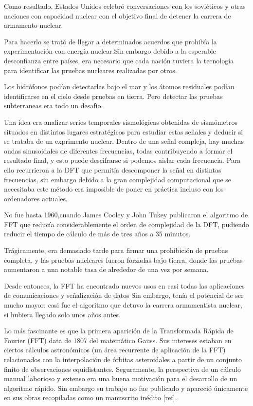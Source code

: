 \noindent Como resultado, Estados Unidos celebró conversaciones con los soviéticos y otras naciones con capacidad nuclear con el objetivo final de detener la carrera de armamento nuclear.

\noindent Para hacerlo se trató de llegar a determinados acuerdos que prohibía la experimentación con energía nuclear.Sin embargo debido a la esperable desconfianza entre países, era necesario que cada nación tuviera la tecnología para identificar las pruebas nucleares realizadas por otros. 

\noindent Los hidrófonos podían detectarlas bajo el mar y los átomos residuales podían identificarse en el cielo desde pruebas en tierra. Pero detectar las pruebas subterraneas era todo un desafío.


\noindent Una idea era analizar series temporales
sismológicas obtenidas de sismómetros situados en distintos lugares estratégicos para estudiar estas señales y deducir si se trataba de un exprimento nuclear.
Dentro de una señal compleja, hay muchas ondas sinusoidales de diferentes frecuencias, todas contribuyendo a formar el resultado final, y esto puede descifrarse si podemos aislar cada frecuencia. Para ello  recurrieron a la DFT que permitía descomponer la señal en distintas frecuencias, sin embargo  debido a la gran complejidad computacional que se necesitaba este método era imposible de poner en práctica incluso con los ordenadores actuales.

\noindent No fue hasta 1960,cuando James Cooley y John Tukey  publicaron el algoritmo de FFT que reducía considerablemente el orden de complejidad de la DFT, pudiendo reducir el tiempo de cálculo de más de tres años a 35 minutos.

\noindent Trágicamente, era demasiado tarde para firmar una prohibición de pruebas completa, y las pruebas nucleares fueron forzadas bajo tierra, donde las pruebas aumentaron a una notable tasa de alrededor de una vez por semana.

\noindent Desde entonces, la FFT ha encontrado nuevos usos en casi todas las aplicaciones de comunicaciones y señalización de datos Sin embargo, tenía el potencial de ser mucho mayor: casi fue el algoritmo que detuvo la carrera armamentista nuclear, si hubiera llegado solo unos años antes.


\noindent Lo más fascinante es que la primera aparición de la Transformada Rápida de Fourier (FFT) data de 1807 del matemático Gauss.
Sus intereses estaban en ciertos cálculos astronómicos (un área recurrente de aplicación de la FFT) relacionados con la interpolación de órbitas asteroidales a partir de un conjunto finito de observaciones equidistantes. Seguramente, la perspectiva de un cálculo manual laborioso y extenso era una buena motivación para el desarrollo de un algoritmo rápido. Sin embargo su trabajo no fue publicado y apareció únicamente en sus obras recopiladas como un manuscrito inédito  [ref].

